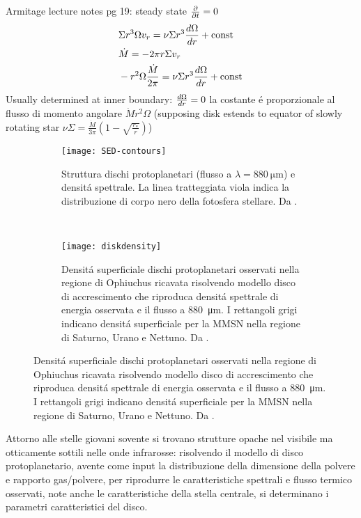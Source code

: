 \begin{workout}
	Armitage lecture notes pg 19: steady state $\frac{\partial}{\partial t}=0$
	\begin{align*}
&\Sigma r^3\Omega v_r=\nu\Sigma r^3\frac{d \Omega}{d r}+\operatorname{const}{}\\
&\dot{M}=-2\pi r\Sigma v_r\\
&-r^2\Omega\frac{\dot{M}}{2\pi}=\nu\Sigma r^3\frac{d \Omega}{d r}+\operatorname{const}{}
	\end{align*}
Usually determined at inner boundary: $\frac{d \Omega}{d r}=0$ la costante \'e proporzionale al flusso di momento angolare $\dot{M}r^2\Omega$ (supposing disk estends to equator of slowly rotating star $\nu\Sigma=\frac{\dot{M}}{3\pi}(1-\sqrt{\frac{r_*}{r}})$)
\end{workout}
\begin{figure}[!ht]
	\begin{subfigure}[b]{0.39\textwidth}
		\centering
		\texttt{[image: SED-contours]}
		\caption{Struttura dischi protoplanetari (flusso a $\lambda=\SI{880}{\micro\meter}$) e densit\'a spettrale. La linea tratteggiata viola indica la distribuzione di corpo nero della fotosfera stellare. Da \cite{andrews2010protoplanetary}.}\label{fig:SED-contours}
	\end{subfigure}
	~
	\begin{subfigure}[b]{0.55\textwidth}
		\texttt{[image: diskdensity]}
		\caption{Densit\'a superficiale dischi protoplanetari osservati nella regione di Ophiuchus ricavata risolvendo modello disco di accrescimento che riproduca densit\'a spettrale di energia osservata e il flusso a \SI{880}{\micro\meter}. I rettangoli grigi indicano densit\'a superficiale per la MMSN nella regione di Saturno, Urano e Nettuno. Da \cite{andrews2010protoplanetary}.}\label{fig:diskdensity}
	\end{subfigure}
\end{figure}

\begin{errata}
Attorno alle stelle giovani sovente si trovano strutture opache nel visibile ma otticamente sottili nelle onde infrarosse: risolvendo il modello di disco protoplanetario, avente come input la distribuzione della dimensione della polvere e rapporto gas/polvere, per riprodurre le caratteristiche spettrali e flusso termico osservati, note anche le caratteristiche della stella centrale, si determinano i parametri caratteristici del disco.
\end{errata}

